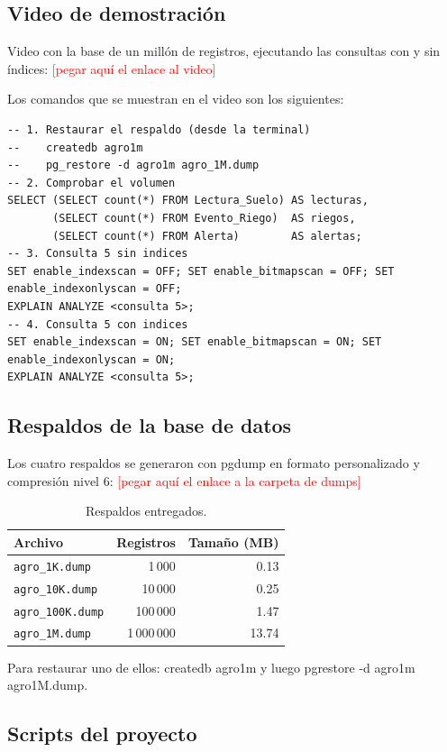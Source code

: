 \documentclass[11pt,letterpaper]{article}
\newcommand{\enlaceVideo}{\textcolor{red}{[pegar aquí el enlace al video]}}
\newcommand{\enlaceDumps}{\textcolor{red}{[pegar aquí el enlace a la carpeta de dumps]}}
\newcommand{\tbus}{\textunderscore\allowbreak}
\newcommand{\tb}[1]{{\ttfamily\let\_\tbus #1}}
\begin{document}
\subsection{Video de demostración}

Video con la base de un millón de registros, ejecutando las consultas con y sin índices: \enlaceVideo

Los comandos que se muestran en el video son los siguientes:

\begin{lstlisting}
-- 1. Restaurar el respaldo (desde la terminal)
--    createdb agro1m
--    pg_restore -d agro1m agro_1M.dump
-- 2. Comprobar el volumen
SELECT (SELECT count(*) FROM Lectura_Suelo) AS lecturas,
       (SELECT count(*) FROM Evento_Riego)  AS riegos,
       (SELECT count(*) FROM Alerta)        AS alertas;
-- 3. Consulta 5 sin indices
SET enable_indexscan = OFF; SET enable_bitmapscan = OFF; SET enable_indexonlyscan = OFF;
EXPLAIN ANALYZE <consulta 5>;
-- 4. Consulta 5 con indices
SET enable_indexscan = ON; SET enable_bitmapscan = ON; SET enable_indexonlyscan = ON;
EXPLAIN ANALYZE <consulta 5>;
\end{lstlisting}

\subsection{Respaldos de la base de datos}

Los cuatro respaldos se generaron con \tb{pg\_dump} en formato personalizado y compresión nivel 6: \enlaceDumps

\begin{table}[H]
\centering\small
\begin{tabular}{lrr}
\toprule
Archivo & Registros & Tamaño (MB) \\
\midrule
\texttt{agro\_1K.dump} & 1\,000 & 0.13 \\
\texttt{agro\_10K.dump} & 10\,000 & 0.25 \\
\texttt{agro\_100K.dump} & 100\,000 & 1.47 \\
\texttt{agro\_1M.dump} & 1\,000\,000 & 13.74 \\
\bottomrule
\end{tabular}
\caption{Respaldos entregados.}\label{tab:dumps}
\end{table}


Para restaurar uno de ellos: \tb{createdb agro1m} y luego \tb{pg\_restore -d agro1m agro\_1M.dump}.

\subsection{Scripts del proyecto}
\end{document}
